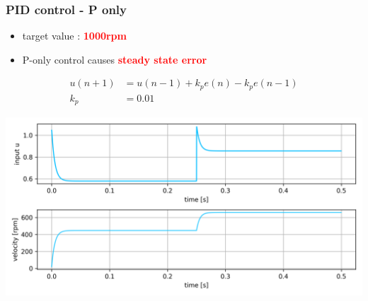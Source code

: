 \documentclass{beamer}
\begin{document}
\begin{frame}
  
  \frametitle{\textbf { PID control - P only}}

  \begin{itemize}
    \item  target value : \textcolor{red}{\textbf { 1000rpm}}
    \item  P-only control causes \textcolor{red}{\textbf { steady state error}}
  \end{itemize}
  
 
  \begin{align*}
    u(n+1) &= u(n-1) + k_pe(n) - k_pe(n-1) \\
    k_p    &= 0.01
  \end{align*}

  {\centering \includegraphics[scale=0.4]{../images/motor_control/pid_p_control.png}}

\end{frame}
\end{document}
